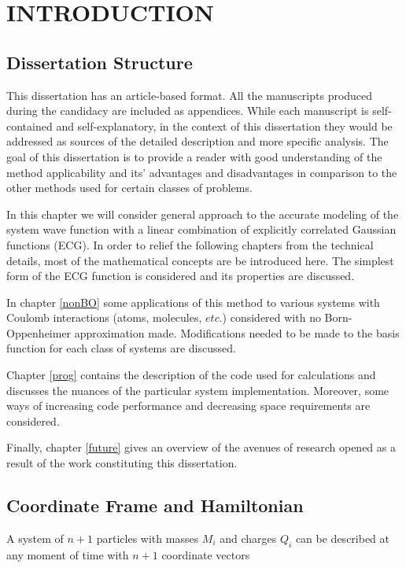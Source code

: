 \chapter{INTRODUCTION\label{chap1}}

\section{Dissertation Structure}

This dissertation has an article-based format. All the manuscripts produced
during the candidacy are included as appendices. While each manuscript is 
self-contained and self-explanatory, in the context of this dissertation
they would be addressed as sources of the detailed description and more
specific analysis. The goal of this dissertation is to provide a reader 
with good understanding of the method applicability and its' advantages
and disadvantages in comparison to the other methods used for certain
classes of problems. 

In this chapter we will consider general approach to the accurate modeling
of the system wave function with a linear combination of explicitly 
correlated Gaussian functions (ECG). In order to relief the following 
chapters from the technical details, most of the mathematical concepts
are be introduced here. The simplest form of the ECG function is considered
and its properties are discussed. 

In chapter \ref{nonBO} some applications of this method to 
various systems with Coulomb interactions (atoms, molecules, $etc.$)
considered with no Born-Oppenheimer approximation made.
Modifications needed to be made to the basis function for each class
of systems are discussed.

Chapter \ref{prog} contains the description of the code used for calculations
and discusses the nuances of the particular system implementation.
Moreover, some ways of increasing code performance and decreasing space 
requirements are considered.

Finally, chapter \ref{future} gives an overview of  the avenues of research 
opened as a result of the work constituting this dissertation.

\section{Coordinate Frame and Hamiltonian}

A system of $n+1$ particles with masses $M_i$ and charges $Q_i$ can be
described at any moment of time with $n+1$ coordinate vectors  

